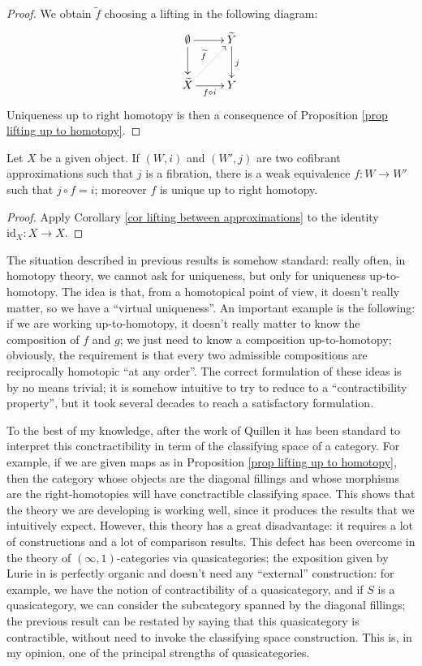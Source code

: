 \begin{proof}
We obtain $\widetilde{f}$ choosing a lifting in the following diagram:
\[
\xymatrix{
\emptyset \ar[d] \ar[r] & \widetilde{Y} \ar[d]^j \\ \widetilde{X} \ar@{.>}[ur]^{\widetilde{f}} \ar[r]_{f \circ i} & Y
}
\]
Uniqueness up to right homotopy is then a consequence of Proposition \ref{prop lifting up to homotopy}.
\end{proof}

\begin{cor} \label{cor uniqueness of approximation}
Let $X$ be a given object. If $(W,i)$ and $(W',j)$ are two cofibrant approximations such that $j$ is a fibration, there is a weak equivalence $f \colon W \to W'$ such that $j \circ f = i$; moreover $f$ is unique up to right homotopy.
\end{cor}

\begin{proof}
Apply Corollary \ref{cor lifting between approximations} to the identity $\mathrm{id}_X \colon X \to X$.
\end{proof}

\begin{rmk}
The situation described in previous results is somehow standard: really often, in homotopy theory, we cannot ask for uniqueness, but only for uniqueness up-to-homotopy. The idea is that, from a homotopical point of view, it doesn't really matter, so we have a ``virtual uniqueness''. An important example is the following: if we are working up-to-homotopy, it doesn't really matter to know the composition of $f$ and $g$; we just need to know a composition up-to-homotopy; obviously, the requirement is that every two admissible compositions are reciprocally homotopic ``at any order''. The correct formulation of these ideas is by no means trivial; it is somehow intuitive to try to reduce to a ``contractibility property'', but it took several decades to reach a satisfactory formulation.

To the best of my knowledge, after the work of Quillen it has been standard to interpret this conctractibility in term of the classifying space of a category. For example, if we are given maps as in Proposition \ref{prop lifting up to homotopy}, then the category whose objects are the diagonal fillings and whose morphisms are the right-homotopies will have conctractible classifying space. This shows that the theory we are developing is working well, since it produces the results that we intuitively expect. However, this theory has a great disadvantage: it requires a lot of constructions and a lot of comparison results. This defect has been overcome in the theory of $(\infty,1)$-categories via quasicategories; the exposition given by Lurie in \cite{htt} is perfectly organic and doesn't need any ``external'' construction: for example, we have the notion of contractibility of a quasicategory, and if $S$ is a quasicategory, we can consider the subcategory spanned by the diagonal fillings; the previous result can be restated by saying that this quasicategory is contractible, without need to invoke the classifying space construction. This is, in my opinion, one of the principal strengths of quasicategories.
\end{rmk}

